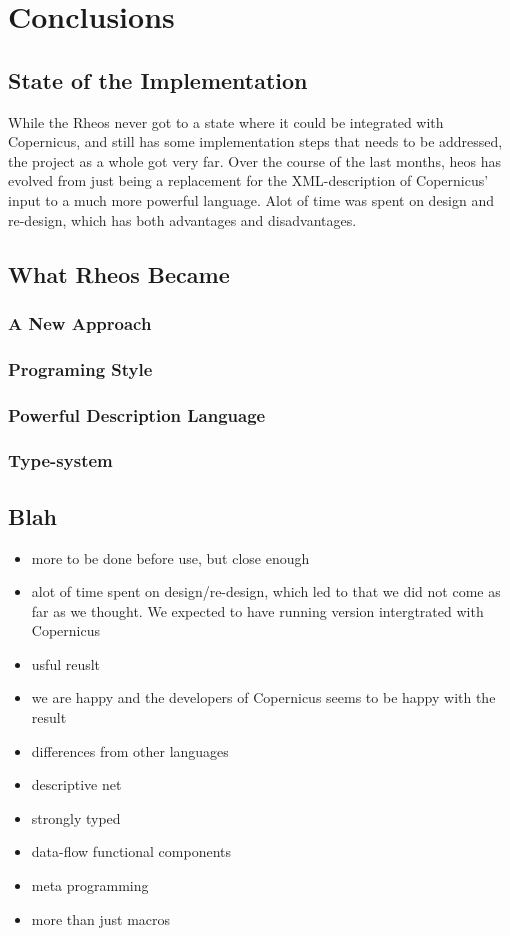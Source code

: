 \chapter{Conclusions}

\section{State of the Implementation}
While the Rheos never got to a state where it could be integrated with
Copernicus, and still has some implementation steps that needs to be
addressed, the project as a whole got very far. Over the course of the
last months, heos has evolved from just being a replacement for the
XML-description of Copernicus' input to a much more powerful
language. Alot of time was spent on design and re-design, which has
both advantages and disadvantages.


\section{What Rheos Became}

\subsection{A New Approach}

\subsection{Programing Style}

\subsection{Powerful Description Language}

\subsection{Type-system}


\section{Blah}
\begin{itemize}
\item more to be done before use, but close enough
\item alot of time spent on design/re-design, which led to that we did
  not come as far as we thought. We expected to have running version
  intergtrated with Copernicus
\item usful reuslt
\item we are happy and the developers of Copernicus seems to be happy
  with the result
\item differences from other languages
\item descriptive net
\item strongly typed
\item data-flow functional components
\item meta programming
\item more than just macros
\end{itemize}

